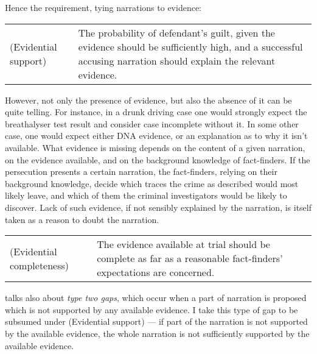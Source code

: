 \documentclass[10pt,leqno]{article}
\begin{document}
 
   Hence the  requirement, tying narrations to evidence:
 
 \begin{center}
\begin{tabular}{lp{8cm}}
 (Evidential support) &The  probability of defendant's guilt, given  the evidence should be sufficiently high, and a successful accusing narration should explain the relevant evidence. 
\end{tabular}
\end{center}



However, not only the presence of evidence, but also the absence of it can be quite telling. For instance, in a drunk driving  case one would strongly expect the breathalyser test result  and consider case incomplete without it. In some other case, one would expect either DNA evidence, or an explanation as to why it isn't available. What evidence is missing depends on the content of a given narration, on the evidence available, and on the background knowledge of fact-finders. If the persecution presents a certain narration, the fact-finders, relying on their background knowledge, decide which traces the crime as described would most likely leave, and which of them the criminal investigators would be likely to discover. Lack of such evidence, if not sensibly explained by the narration, is itself taken as a reason to doubt the narration.



 \begin{center}
\begin{tabular}{lp{7cm}}
(Evidential completeness) &  The evidence available at trial should be complete as far as a reasonable fact-finders' expectations are concerned.
\end{tabular}\end{center}



\citet[209]{di2013statistics} talks also  about \emph{type two gaps}, which occur when a part of narration is proposed which is not supported by any available evidence. I take this type of gap to be subsumed under (Evidential support) --- if part of the narration is not supported by the available evidence, the whole narration is not sufficiently supported by the available evidence.
\end{document}
